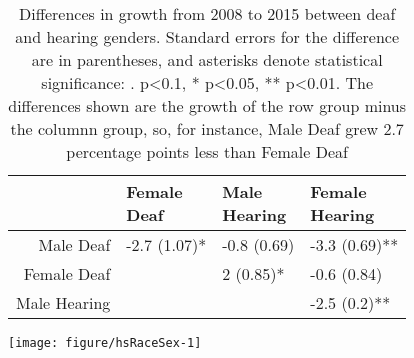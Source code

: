 \documentclass{article}\usepackage[]{graphicx}\usepackage[]{color}
\makeatletter
\def\maxwidth{ %
  \ifdim\Gin@nat@width>\linewidth
    \linewidth
  \else
    \Gin@nat@width
  \fi
}
\newenvironment{knitrout}{}{} %
\makeatother
\begin{document}
\begin{table}[ht]
\centering
\begin{tabular}{rlll}
  \hline
 & \thead{Female\\Deaf} & \thead{Male\\Hearing} & \thead{Female\\Hearing} \\
  \hline
Male Deaf & -2.7 (1.07)* & -0.8 (0.69) & -3.3 (0.69)** \\
  Female Deaf &  & 2 (0.85)* & -0.6 (0.84) \\
  Male Hearing &  &  & -2.5 (0.2)** \\
   \hline
\end{tabular}
\caption{Differences in growth from 2008 to 2015 between deaf and hearing genders. Standard errors for the difference are in parentheses, and asterisks denote statistical significance: . p<0.1, * p<0.05, ** p<0.01. The differences shown are the growth of the row group minus the columnn group, so, for instance, Male Deaf grew 2.7 percentage points less than Female Deaf}
\label{tab:bachSexGrowth}
\end{table}



\clearpage
\begin{center}
\begin{knitrout}
\color{fgcolor}
\texttt{[image: figure/hsRaceSex-1]}

\end{knitrout}

\end{center}
\end{document}
